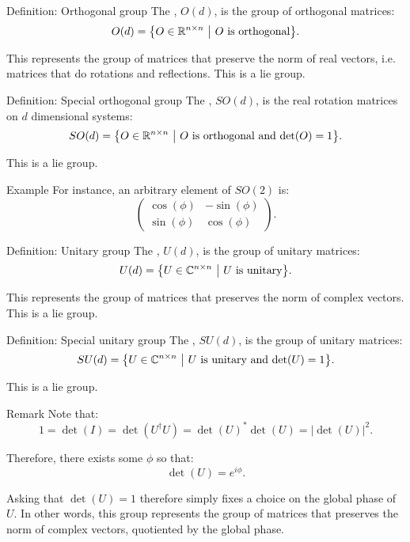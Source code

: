 \documentclass[a4paper]{article}
\begin{document}
\begin{parag}{Definition: Orthogonal group}
    The , $O\left(d\right)$, is the group of orthogonal matrices: 
    \[O\left(d\right) = \left\{O \in \mathbb{R}^{n \times n} \suchthat \text{$O$ is orthogonal}\right\}.\]

    This represents the group of matrices that preserve the norm of real vectors, i.e. matrices that do rotations and reflections. This is a lie group.
\end{parag}

\begin{parag}{Definition: Special orthogonal group}
    The , $SO\left(d\right)$, is the real rotation matrices on $d$ dimensional systems: 
    \[SO\left(d\right) = \left\{O \in \mathbb{R}^{n \times n} \suchthat \text{$O$ is orthogonal and $\det\left(O\right) = 1$}\right\}.\]

    This is a lie group.

    \begin{subparag}{Example}
        For instance, an arbitrary element of $SO\left(2\right)$ is: 
        \[\begin{pmatrix} \cos\left(\phi\right) & -\sin\left(\phi\right) \\ \sin\left(\phi\right) & \cos\left(\phi\right) \end{pmatrix}.\]
    \end{subparag}
\end{parag}

\begin{parag}{Definition: Unitary group}
    The , $U\left(d\right)$, is the group of unitary matrices: 
    \[U\left(d\right) = \left\{U \in \mathbb{C}^{n \times n} \suchthat \text{$U$ is unitary}\right\}.\]

    This represents the group of matrices that preserves the norm of complex vectors. This is a lie group.
\end{parag}

\begin{parag}{Definition: Special unitary group}
    The , $SU\left(d\right)$, is the group of unitary matrices: 
    \[SU\left(d\right) = \left\{U \in \mathbb{C}^{n \times n} \suchthat \text{$U$ is unitary and $\det\left(U\right) = 1$}\right\}.\]

    This is a lie group.

    \begin{subparag}{Remark}
        Note that: 
        \[1 = \det\left(I\right) = \det\left(U^{\dagger} U\right) = \det\left(U\right)^* \det\left(U\right) = \left|\det\left(U\right)\right|^2.\]

        Therefore, there exists some $\phi$ so that: 
        \[\det\left(U\right) = e^{i \phi}.\]
        
        Asking that $\det\left(U\right) = 1$ therefore simply fixes a choice on the global phase of $U$. In other words, this group represents the group of matrices that preserves the norm of complex vectors, quotiented by the global phase. 
    \end{subparag}
\end{parag}
\end{document}
